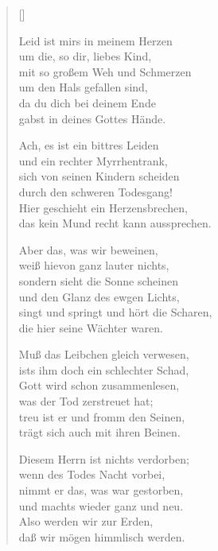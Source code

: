 \begin{multicols}{2}
\settowidth{\versewidth}{Muß das Leibchen gleich verwesen,}
\begin{verse}[\versewidth]

 Leid ist mirs in meinem Herzen\\
um die, so dir, liebes Kind,\\
mit so großem Weh und Schmerzen\\
um den Hals gefallen sind,\\
da du dich bei deinem Ende\\
gabst in deines Gottes Hände.

 Ach, es ist ein bittres Leiden\\
und ein rechter Myrrhentrank,\\
sich von seinen Kindern scheiden\\
durch den schweren Todesgang!\\
Hier geschieht ein Herzensbrechen,\\
das kein Mund recht kann aussprechen.

 Aber das, was wir beweinen,\\
weiß hievon ganz lauter nichts,\\
sondern sieht die Sonne scheinen\\
und den Glanz des ewgen Lichts,\\
singt und springt und hört die Scharen,\\
die hier seine Wächter waren.

 Muß das Leibchen gleich verwesen,\\
ists ihm doch ein schlechter Schad,\\
Gott wird schon zusammenlesen,\\
was der Tod zerstreuet hat;\\
treu ist er und fromm den Seinen,\\
trägt sich auch mit ihren Beinen.

 Diesem Herrn ist nichts verdorben;\\
wenn des Todes Nacht vorbei,\\
nimmt er das, was war gestorben,\\
und machts wieder ganz und neu.\\
Also werden wir zur Erden,\\
daß wir mögen himmlisch werden.


\end{verse}
\end{multicols}
